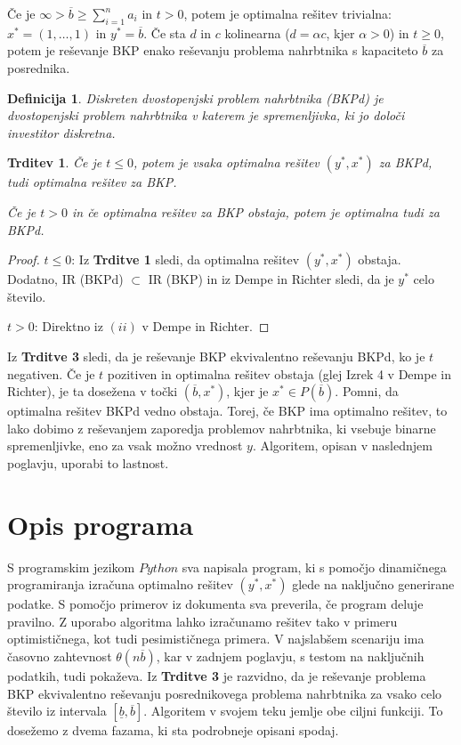 \documentclass[a4paper, 11pt]{article}
\newtheorem{theorem}{Trditev}
\newtheorem{definition}{Definicija}
\begin{document}
	Če je $\infty > \overline{b} \geq \sum_{i=1}^na_i$ in $t > 0$, potem je optimalna rešitev trivialna: $x^* = (1, \dots, 1)$ in $y^* = \overline{b}$. Če sta $d$ in $c$ kolinearna ($d = \alpha c$, kjer $\alpha > 0$) in $t \geq 0$, potem je reševanje BKP enako reševanju problema nahrbtnika s kapaciteto $\overline{b}$ za posrednika.
	
	\begin{definition}
	Diskreten dvostopenjski problem nahrbtnika (BKPd) je dvostopenjski problem nahrbtnika v katerem je spremenljivka, ki jo določi investitor diskretna.
	\end{definition}

	\begin{theorem}
	Če je $t \leq 0$, potem je vsaka optimalna rešitev $(y^*, x^*)$ za BKPd, tudi optimalna rešitev za BKP.
	
	Če je $t > 0$ in če optimalna rešitev za BKP obstaja, potem je optimalna tudi za BKPd.	
	\end{theorem}
	
	\begin{proof}
	$t \leq 0$: Iz \textbf{Trditve 1} sledi, da optimalna rešitev $(y^*, x^*)$ obstaja. Dodatno, IR (BKPd) $\subset$ IR (BKP) in iz Dempe in Richter sledi, da je $y^*$ celo število.
	
	$t > 0$: Direktno iz $(ii)$ v Dempe in Richter.
	\end{proof}

	Iz \textbf{Trditve 3} sledi, da je reševanje BKP ekvivalentno reševanju BKPd, ko je $t$ negativen. Če je $t$ pozitiven in optimalna rešitev obstaja (glej Izrek 4 v Dempe in Richter), je ta dosežena v točki $(\overline{b}, x^*)$, kjer je $x^* \in P(\overline{b})$. Pomni, da optimalna rešitev BKPd vedno obstaja. Torej, če BKP ima optimalno rešitev, to lako dobimo z reševanjem zaporedja problemov nahrbtnika, ki vsebuje binarne spremenljivke, eno za vsak možno vrednost $y$. Algoritem, opisan v naslednjem poglavju, uporabi to lastnost.
	
	\section{Opis programa}
	
	S programskim jezikom $Python$ sva napisala program, ki s pomočjo dinamičnega programiranja izračuna optimalno rešitev $(y^*, x^*)$ glede na naključno generirane podatke. S pomočjo primerov iz dokumenta sva preverila, če program deluje pravilno. Z uporabo algoritma lahko izračunamo rešitev tako v primeru optimističnega, kot tudi pesimističnega primera. V najslabšem scenariju ima časovno zahtevnost $\theta(n\overline{b})$, kar v zadnjem poglavju, s testom na naključnih podatkih, tudi pokaževa. Iz \textbf{Trditve 3} je razvidno, da je reševanje problema BKP ekvivalentno reševanju posrednikovega problema nahrbtnika za vsako celo število iz intervala $[ \underline{b}, \overline{b}]$. Algoritem v svojem teku jemlje obe ciljni funkciji. To dosežemo z dvema fazama, ki sta podrobneje opisani spodaj. \\
\end{document}
